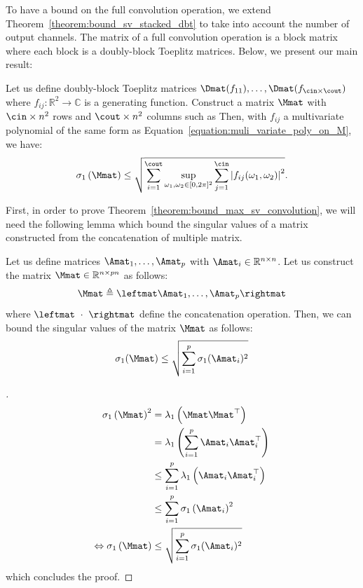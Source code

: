 To have a bound on the full convolution operation, we extend Theorem~\ref{theorem:bound_sv_stacked_dbt} to take into account the number of output channels.
The matrix of a full convolution operation is a block matrix where each block is a doubly-block Toeplitz matrices. Below, we present our main result:

\begin{theorem} \label{theorem:bound_max_sv_convolution} 
Let us define doubly-block Toeplitz matrices $\Dmat(f_{11}), \dots, \Dmat(f_{\cin\times \cout})$ where $f_{ij}: \mathbb{R}^2 \rightarrow \mathbb{C}$ is a generating function. Construct a matrix $\Mmat$ with $\cin\times n^2$ rows and $\cout\times n^2$ columns such as
Then, with $f_{ij}$ a multivariate polynomial of the same form as Equation~\ref{equation:muli_variate_poly_on_M}, we have:
\begin{equation} \label{equation:lipbound_sv}
 \sigma_1 \left( \Mmat \right) \leq \sqrt{ \sum_{i=1}^{\cout} \sup_{\omega_1, \omega_2 \in [0, 2\pi]^2} \sum_{j = 1}^{\cin} \left|f_{ij}(\omega_1, \omega_2) \right|^2 } .
\end{equation} 
\end{theorem}


First, in order to prove Theorem~\ref{theorem:bound_max_sv_convolution}, we will need the following lemma which bound the singular values of a matrix constructed from the concatenation of multiple matrix. 

\begin{lemma} \label{theorem:bound_concatenation_matrices}
Let us define matrices $\Amat_1, \dots, \Amat_p$ with $\Amat_i \in \mathbb{R}^{n \times n}$. Let us construct the matrix $\Mmat \in \mathbb{R}^{n \times pn}$ as follows:
\begin{equation}
    \Mmat \triangleq \leftmat \Amat_1, \dots, \Amat_p \rightmat
\end{equation}
where $\leftmat\ \cdot\ \rightmat$ define the concatenation operation. Then, we can bound the singular values of the matrix $\Mmat$ as follows:
\begin{equation}
    \sigma_1(\Mmat) \leq \sqrt{\sum_{i=1}^p \sigma_1(\Amat_i)^2}
\end{equation}
\end{lemma}
\begin{proof}[]
\begin{align}
    \sigma_1\left(\Mmat\right)^2 &= \lambda_1\left(\Mmat \Mmat^\top\right) \\
    &= \lambda_1\left( \sum_{i=1}^p\Amat_i \Amat_i^\top  \right) \\
    &\leq \sum_{i=1}^p \lambda_1\left( \Amat_i \Amat_i^\top  \right) \\
    &\leq \sum_{i=1}^p \sigma_1\left( \Amat_i \right)^2 \\
    \Leftrightarrow \sigma_1\left(\Mmat\right) &\leq \sqrt{\sum_{i=1}^p \sigma_1(\Amat_i)^2}
\end{align}
which concludes the proof.
\end{proof}


